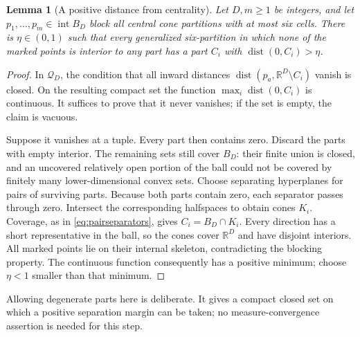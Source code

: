 \documentclass[a4paper,11pt,reqno]{amsart}
\newcommand{\R}{\mathbb R}
\newcommand{\intt}{\operatorname{int}}
\newcommand{\dist}{\operatorname{dist}}
\newtheorem{lemma}[theorem]{Lemma}
\theoremstyle{definition}
\theoremstyle{remark}
\numberwithin{equation}{section}
\begin{document}
\begin{lemma}[A positive distance from centrality]\label{lem:nearcentral}
Let $D,m\ge1$ be integers, and let $p_1,\ldots,p_m\in\intt B_D$
block all central cone partitions with at most six cells. There is
$\eta\in(0,1)$ such that every generalized six-partition in which
none of the marked points is interior to any part has a part $C_i$
with $\dist(0,C_i)>\eta$.
\end{lemma}
\begin{proof}
In $\mathcal Q_D$, the condition that all inward distances
$\dist(p_a,\R^D\setminus C_i)$ vanish is closed. On the resulting
compact set the function $\max_i\dist(0,C_i)$ is continuous. It
suffices to prove that it never vanishes; if the set is empty, the
claim is vacuous.

Suppose it vanishes at a tuple. Every part then contains zero.
Discard the parts with empty interior. The remaining sets still
cover $B_D$: their finite union is closed, and an uncovered relatively
open portion of the ball could not be covered by finitely many
lower-dimensional convex sets. Choose separating hyperplanes for
pairs of surviving parts. Because both parts contain zero, each
separator passes through zero. Intersect the corresponding halfspaces
to obtain cones $K_i$. Coverage, as in \eqref{eq:pairseparators}, gives
$C_i=B_D\cap K_i$. Every direction has a short representative in the
ball, so the cones cover $\R^D$ and have disjoint interiors. All marked
points lie on their internal skeleton, contradicting the blocking
property. The continuous function consequently has a positive minimum;
choose $\eta<1$ smaller than that minimum.
\end{proof}

Allowing degenerate parts here is deliberate. It gives a compact
closed set on which a positive separation margin can be taken; no
measure-convergence assertion is needed for this step.
\end{document}
